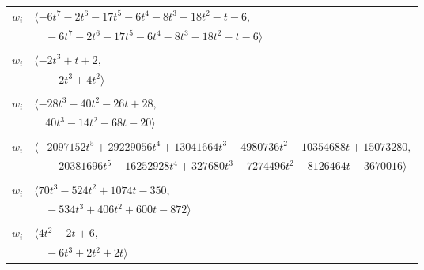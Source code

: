 \documentclass[11pt]{article}
\begin{document}
\begin{longtable}{@{}ll@{}}
$w_i$ & $\langle -6t^{7}-2t^{6}-17t^{5}-6t^{4}-8t^{3}-18t^{2}-t-6,$\\
 & $\quad -6t^{7}-2t^{6}-17t^{5}-6t^{4}-8t^{3}-18t^{2}-t-6\rangle$\\
\addlinespace[2pt]
\multicolumn{2}{@{}p{0.97\textwidth}@{}}{$i=27$, $D_i=2$, $\rho_{ij}$: $1{:}2, \allowbreak 5{:}2, \allowbreak 14{:}2, \allowbreak 23{:}1, \allowbreak 24{:}1, \allowbreak 26{:}1, \allowbreak 40{:}2$}\\
$w_i$ & $\langle -2t^{3}+t+2,$\\
 & $\quad -2t^{3}+4t^{2}\rangle$\\
\addlinespace[2pt]
\multicolumn{2}{@{}p{0.97\textwidth}@{}}{$i=28$, $D_i=28$, $\rho_{ij}$: $0{:}2, \allowbreak 1{:}1, \allowbreak 5{:}2, \allowbreak 6{:}2, \allowbreak 11{:}1, \allowbreak 37{:}2, \allowbreak 39{:}1$}\\
$w_i$ & $\langle -28t^{3}-40t^{2}-26t+28,$\\
 & $\quad 40t^{3}-14t^{2}-68t-20\rangle$\\
\addlinespace[2pt]
\multicolumn{2}{@{}p{0.97\textwidth}@{}}{$i=29$, $D_i=32768$, $\rho_{ij}$: $10{:}2, \allowbreak 11{:}1, \allowbreak 12{:}2, \allowbreak 13{:}2, \allowbreak 15{:}1, \allowbreak 30{:}1, \allowbreak 39{:}2, \allowbreak 41{:}2, \allowbreak 42{:}1, \allowbreak 51{:}2, \allowbreak 54{:}1, \allowbreak 56{:}2, \allowbreak 57{:}2, \allowbreak 59{:}1, \allowbreak 60{:}1, \allowbreak 61{:}1$}\\
$w_i$ & $\langle -2097152t^{5}+29229056t^{4}+13041664t^{3}-4980736t^{2}-10354688t+15073280,$\\
 & $\quad -20381696t^{5}-16252928t^{4}+327680t^{3}+7274496t^{2}-8126464t-3670016\rangle$\\
\addlinespace[2pt]
\multicolumn{2}{@{}p{0.97\textwidth}@{}}{$i=30$, $D_i=32$, $\rho_{ij}$: $17{:}2, \allowbreak 23{:}2, \allowbreak 29{:}2, \allowbreak 35{:}2, \allowbreak 37{:}2, \allowbreak 41{:}1, \allowbreak 47{:}1, \allowbreak 48{:}1, \allowbreak 50{:}2, \allowbreak 52{:}1, \allowbreak 55{:}1$}\\
$w_i$ & $\langle 70t^{3}-524t^{2}+1074t-350,$\\
 & $\quad -534t^{3}+406t^{2}+600t-872\rangle$\\
\addlinespace[2pt]
\multicolumn{2}{@{}p{0.97\textwidth}@{}}{$i=31$, $D_i=4$, $\rho_{ij}$: $4{:}2, \allowbreak 13{:}2, \allowbreak 25{:}2, \allowbreak 32{:}2, \allowbreak 46{:}2$}\\
$w_i$ & $\langle 4t^{2}-2t+6,$\\
 & $\quad -6t^{3}+2t^{2}+2t\rangle$\\

\end{longtable}
\end{document}
